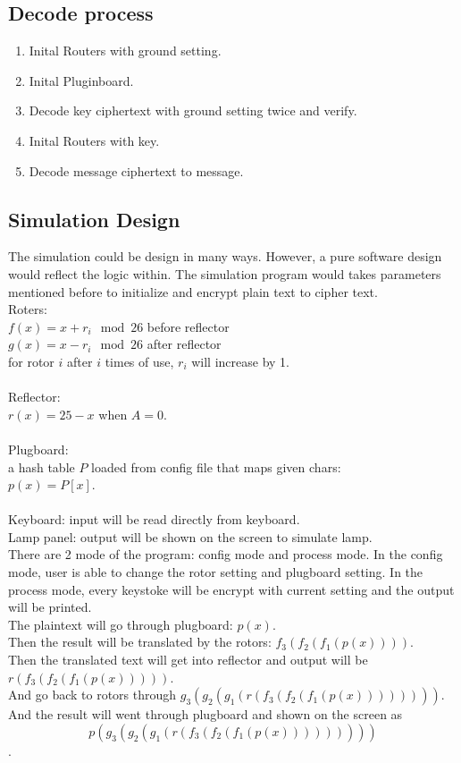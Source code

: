 \documentclass[11pt,a4paper]{article}
\begin{document}
\subsection{Decode process}
\begin{enumerate}
\item Inital Routers with ground setting.
\item Inital Pluginboard.
\item Decode key ciphertext with ground setting twice and verify.
\item Inital Routers with key.
\item Decode message ciphertext to message.
\end{enumerate}

\subsection{Simulation Design}
The simulation could be design in many ways. However, a pure software design would reflect the logic within. The simulation program would takes parameters mentioned before to initialize and encrypt plain text to cipher text.\\
Roters: \\
$f(x) = x + r_i \mod 26$ before reflector\\
$g(x) = x - r_i \mod 26$ after reflector\\
for rotor $i$ after $i$ times of use, $r_i$ will increase by 1.\\\\
Reflector: \\
$r(x) = 25 - x$ when $A = 0$.\\\\
Plugboard: \\
a hash table $P$ loaded from config file that maps given chars:\\
$p(x) = P[x]$.\\\\
Keyboard: input will be read directly from keyboard.\\
Lamp panel: output will be shown on the screen to simulate lamp.\\

There are 2 mode of the program: config mode and process mode.
In the config mode, user is able to change the rotor setting and plugboard setting.
In the process mode, every keystoke will be encrypt with current setting and the output will be printed.\\
The plaintext will go through plugboard: $p(x)$.\\
Then the result will be translated by the rotors: $f_3(f_2(f_1(p(x))))$.\\
Then the translated text will get into reflector and output will be $r(f_3(f_2(f_1(p(x)))))$.\\
And go back to rotors through $g_3(g_2(g_1(r(f_3(f_2(f_1(p(x))))))))$.\\
And the result will went through plugboard and shown on the screen as $$p(g_3(g_2(g_1(r(f_3(f_2(f_1(p(x)))))))))$$.\\
\end{document}
